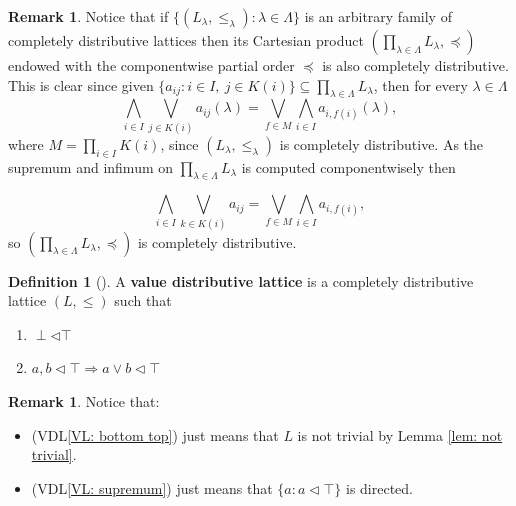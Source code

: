 \documentclass[11pt,a4paper]{amsart}
\theoremstyle{definition}
\newtheorem{definition}[theorem]{Definition}
\newtheorem{example}[theorem]{Example}
\newtheorem{remark}[theorem]{Remark}
\begin{document}
	
	
	
	
	
	
	\begin{remark}\label{rem:product_completelydistributive}
		Notice that if $\{(L_\lambda,\leq_\lambda):\lambda\in \Lambda\}$ is an arbitrary family of completely distributive lattices then its Cartesian product $(\prod_{\lambda\in \Lambda} L_\lambda,\preceq)$ endowed with the componentwise partial order $\preceq$ is also completely distributive. This is clear since given $\{a_{ij}: i\in I,\ j\in K(i)\}\subseteq \prod_{\lambda\in \Lambda} L_\lambda$, then for every $\lambda\in \Lambda$
		\[\bigwedge_{i\in I}\bigvee_{j\in K(i)}a_{ij}(\lambda)=\bigvee_{f\in M}\bigwedge_{i\in I}a_{i,f(i)}(\lambda),\]
		where $M=\prod_{i\in I}K(i)$,
		since $(L_\lambda,\leq_\lambda)$ is completely distributive. As the supremum and infimum on $\prod_{\lambda\in\Lambda} L_\lambda$ is computed componentwisely then
		
		\[\bigwedge_{i\in I}\bigvee_{k\in K(i)}a_{ij}=\bigvee_{f\in M}\bigwedge_{i\in I}a_{i,f(i)},\]
		so $(\prod_{\lambda\in \Lambda} L_\lambda,\preceq)$ is completely distributive.
	\end{remark}
	
	
	\begin{definition}[\cite{Flagg97,FlaggKopp97}]\label{def:valuedl}
		A \textbf{value distributive lattice} is a completely distributive lattice  $(L,\leq)$ such that
		\begin{enumerate}[(VDL1)]
			\item\label{VL: bottom top} $\perp\lhd \top$
			\item\label{VL: supremum} $a,b\lhd\top\Rightarrow a\vee b\lhd\top$
		\end{enumerate}
	\end{definition}
	
	\begin{remark}
		Notice that: 
		\begin{itemize}
			\item  (VDL\ref{VL: bottom top}) just means that $L$ is not trivial by Lemma \ref{lem: not trivial}.
			\item (VDL\ref{VL: supremum}) just means that $\{a:a\lhd \top\}$ is directed.
		\end{itemize}
	\end{remark}
	
\end{document}
